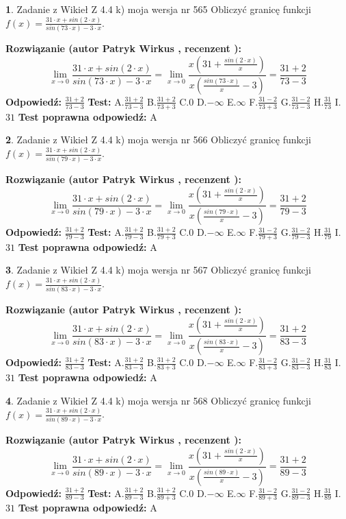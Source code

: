 \documentclass[12pt, a4paper]{article}
\theoremstyle{definition} %
\newtheorem{zad}{}
\newcommand{\zadStart}[1]{\begin{zad}#1\newline}
\newcommand{\zadStop}{\end{zad}}
\newcommand{\rozwStart}[2]{\noindent \textbf{Rozwiązanie (autor #1 , recenzent #2): }\newline}
\newcommand{\rozwStop}{\newline}
\newcommand{\odpStart}{\noindent \textbf{Odpowiedź:}\newline}
\newcommand{\odpStop}{\newline}
\newcommand{\testStart}{\noindent \textbf{Test:}\newline}
\newcommand{\testStop}{\newline}
\newcommand{\kluczStart}{\noindent \textbf{Test poprawna odpowiedź:}\newline}
\newcommand{\kluczStop}{\newline}
\begin{document}
\zadStart{Zadanie z Wikieł Z 4.4 k) moja wersja nr 565}
Obliczyć granicę funkcji $f(x)=\frac{31\cdot x +sin(2\cdot x)}{sin(73\cdot x) -3\cdot x}$.
\zadStop
\rozwStart{Patryk Wirkus}{}
$$\lim\limits_{x\to 0}\frac{31\cdot x +sin(2\cdot x)}{sin(73\cdot x) -3\cdot x}
=\lim\limits_{x\to 0}\frac{x(31+\frac{sin(2\cdot x)}{x})}{x(\frac{sin(73\cdot x)}{x}-3)}
=\frac{31+2}{73-3}$$
\rozwStop
\odpStart
$\frac{31+2}{73-3}$
\odpStop
\testStart
A.$\frac{31+2}{73-3}$
B.$\frac{31+2}{73+3}$
C.$0$
D.$-\infty$
E.$\infty$
F.$\frac{31-2}{73+3}$
G.$\frac{31-2}{73-3}$
H.$\frac{31}{73}$
I.$31$
\testStop
\kluczStart
A
\kluczStop



\zadStart{Zadanie z Wikieł Z 4.4 k) moja wersja nr 566}
Obliczyć granicę funkcji $f(x)=\frac{31\cdot x +sin(2\cdot x)}{sin(79\cdot x) -3\cdot x}$.
\zadStop
\rozwStart{Patryk Wirkus}{}
$$\lim\limits_{x\to 0}\frac{31\cdot x +sin(2\cdot x)}{sin(79\cdot x) -3\cdot x}
=\lim\limits_{x\to 0}\frac{x(31+\frac{sin(2\cdot x)}{x})}{x(\frac{sin(79\cdot x)}{x}-3)}
=\frac{31+2}{79-3}$$
\rozwStop
\odpStart
$\frac{31+2}{79-3}$
\odpStop
\testStart
A.$\frac{31+2}{79-3}$
B.$\frac{31+2}{79+3}$
C.$0$
D.$-\infty$
E.$\infty$
F.$\frac{31-2}{79+3}$
G.$\frac{31-2}{79-3}$
H.$\frac{31}{79}$
I.$31$
\testStop
\kluczStart
A
\kluczStop



\zadStart{Zadanie z Wikieł Z 4.4 k) moja wersja nr 567}
Obliczyć granicę funkcji $f(x)=\frac{31\cdot x +sin(2\cdot x)}{sin(83\cdot x) -3\cdot x}$.
\zadStop
\rozwStart{Patryk Wirkus}{}
$$\lim\limits_{x\to 0}\frac{31\cdot x +sin(2\cdot x)}{sin(83\cdot x) -3\cdot x}
=\lim\limits_{x\to 0}\frac{x(31+\frac{sin(2\cdot x)}{x})}{x(\frac{sin(83\cdot x)}{x}-3)}
=\frac{31+2}{83-3}$$
\rozwStop
\odpStart
$\frac{31+2}{83-3}$
\odpStop
\testStart
A.$\frac{31+2}{83-3}$
B.$\frac{31+2}{83+3}$
C.$0$
D.$-\infty$
E.$\infty$
F.$\frac{31-2}{83+3}$
G.$\frac{31-2}{83-3}$
H.$\frac{31}{83}$
I.$31$
\testStop
\kluczStart
A
\kluczStop



\zadStart{Zadanie z Wikieł Z 4.4 k) moja wersja nr 568}
Obliczyć granicę funkcji $f(x)=\frac{31\cdot x +sin(2\cdot x)}{sin(89\cdot x) -3\cdot x}$.
\zadStop
\rozwStart{Patryk Wirkus}{}
$$\lim\limits_{x\to 0}\frac{31\cdot x +sin(2\cdot x)}{sin(89\cdot x) -3\cdot x}
=\lim\limits_{x\to 0}\frac{x(31+\frac{sin(2\cdot x)}{x})}{x(\frac{sin(89\cdot x)}{x}-3)}
=\frac{31+2}{89-3}$$
\rozwStop
\odpStart
$\frac{31+2}{89-3}$
\odpStop
\testStart
A.$\frac{31+2}{89-3}$
B.$\frac{31+2}{89+3}$
C.$0$
D.$-\infty$
E.$\infty$
F.$\frac{31-2}{89+3}$
G.$\frac{31-2}{89-3}$
H.$\frac{31}{89}$
I.$31$
\testStop
\kluczStart
A
\kluczStop
\end{document}
